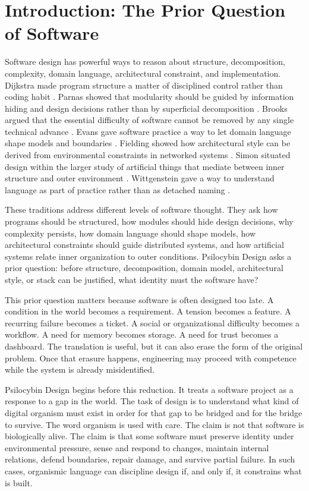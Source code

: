 \documentclass[11pt]{article}
\begin{document}
\section{Introduction: The Prior Question of Software}

Software design has powerful ways to reason about structure, decomposition, complexity, domain language, architectural constraint, and implementation. Dijkstra made program structure a matter of disciplined control rather than coding habit \cite{dijkstra1968}. Parnas showed that modularity should be guided by information hiding and design decisions rather than by superficial decomposition \cite{parnas1972}. Brooks argued that the essential difficulty of software cannot be removed by any single technical advance \cite{brooks1987}. Evans gave software practice a way to let domain language shape models and boundaries \cite{evans2003}. Fielding showed how architectural style can be derived from environmental constraints in networked systems \cite{fielding2000}. Simon situated design within the larger study of artificial things that mediate between inner structure and outer environment \cite{simon2019}. Wittgenstein gave a way to understand language as part of practice rather than as detached naming \cite{wittgenstein2009}.

These traditions address different levels of software thought. They ask how programs should be structured, how modules should hide design decisions, why complexity persists, how domain language should shape models, how architectural constraints should guide distributed systems, and how artificial systems relate inner organization to outer conditions. Psilocybin Design asks a prior question: before structure, decomposition, domain model, architectural style, or stack can be justified, what identity must the software have?

This prior question matters because software is often designed too late. A condition in the world becomes a requirement. A tension becomes a feature. A recurring failure becomes a ticket. A social or organizational difficulty becomes a workflow. A need for memory becomes storage. A need for trust becomes a dashboard. The translation is useful, but it can also erase the form of the original problem. Once that erasure happens, engineering may proceed with competence while the system is already misidentified.

Psilocybin Design begins before this reduction. It treats a software project as a response to a gap in the world. The task of design is to understand what kind of digital organism must exist in order for that gap to be bridged and for the bridge to survive. The word organism is used with care. The claim is not that software is biologically alive. The claim is that some software must preserve identity under environmental pressure, sense and respond to changes, maintain internal relations, defend boundaries, repair damage, and survive partial failure. In such cases, organismic language can discipline design if, and only if, it constrains what is built.
\end{document}

